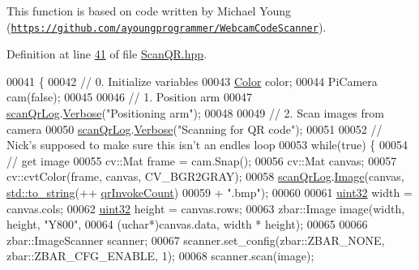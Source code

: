 This function is based on code written by Michael Young (\href{https://github.com/ayoungprogrammer/WebcamCodeScanner}{\tt https\+://github.\+com/ayoungprogrammer/\+Webcam\+Code\+Scanner}). 

Definition at line \hyperlink{ScanQR_8hpp_source_l00041}{41} of file \hyperlink{ScanQR_8hpp_source}{Scan\+Q\+R.\+hpp}.


\begin{DoxyCode}
00041                    \{
00042         \textcolor{comment}{// 0. Initialize variables}
00043         \hyperlink{definitions_8hpp_abc05a0f46084a3477cf5d5c939ff1436}{Color} color;
00044         PiCamera cam(\textcolor{keyword}{false});
00045 
00046         \textcolor{comment}{// 1. Position arm}
00047         \hyperlink{namespaceChipChipArray_ab5c6290951637c25a5422707020fb3a8}{scanQrLog}.\hyperlink{classChipChipArray_1_1Log_a154a5f38d9c7a767693b242684a3d4d9}{Verbose}(\textcolor{stringliteral}{"Positioning arm"});
00048 
00049         \textcolor{comment}{// 2. Scan images from camera}
00050         \hyperlink{namespaceChipChipArray_ab5c6290951637c25a5422707020fb3a8}{scanQrLog}.\hyperlink{classChipChipArray_1_1Log_a154a5f38d9c7a767693b242684a3d4d9}{Verbose}(\textcolor{stringliteral}{"Scanning for QR code"});
00051 
00052         \textcolor{comment}{// Nick's supposed to make sure this isn't an endles loop}
00053         \textcolor{keywordflow}{while}(\textcolor{keyword}{true}) \{           
00054             \textcolor{comment}{// get image}
00055             cv::Mat frame = cam.Snap();
00056             cv::Mat canvas;
00057             cv::cvtColor(frame, canvas, CV\_BGR2GRAY);
00058             \hyperlink{namespaceChipChipArray_ab5c6290951637c25a5422707020fb3a8}{scanQrLog}.\hyperlink{classChipChipArray_1_1Log_a65bbab057c8b1453f9e4efcfee7522c4}{Image}(canvas, \hyperlink{namespacestd_aa5ddf582a1c96ffe258c997be9a294a3}{std::to\_string}(++
      \hyperlink{namespaceChipChipArray_a3b2a3c0ffa9f53021293aeb4955d2fef}{qrInvokeCount})
00059                     + \textcolor{stringliteral}{".bmp"});
00060             
00061             \hyperlink{definitions_8hpp_a1134b580f8da4de94ca6b1de4d37975e}{uint32} width = canvas.cols;
00062             \hyperlink{definitions_8hpp_a1134b580f8da4de94ca6b1de4d37975e}{uint32} height = canvas.rows;
00063             zbar::Image image(width, height, \textcolor{stringliteral}{"Y800"},
00064                     (uchar*)canvas.data, width * height);
00065 
00066             zbar::ImageScanner scanner;
00067             scanner.set\_config(zbar::ZBAR\_NONE, zbar::ZBAR\_CFG\_ENABLE, 1);
00068             scanner.scan(image);

\end{DoxyCode}
